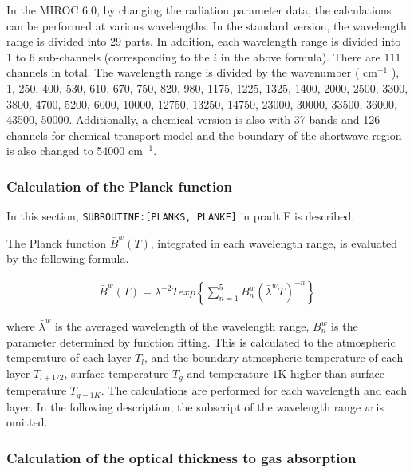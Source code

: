 In the MIROC 6.0, by changing the radiation parameter data, the
calculations can be performed at various wavelengths. In the standard
version, the wavelength range is divided into 29 parts. In addition,
each wavelength range is divided into 1 to 6 sub-channels (corresponding
to the \(i\) in the above formula). There are 111 channels in total. The
wavelength range is divided by the wavenumber ( \(\mathrm{cm}^{-1}\) ),
1, 250, 400, 530, 610, 670, 750, 820, 980, 1175, 1225, 1325, 1400, 2000,
2500, 3300, 3800, 4700, 5200, 6000, 10000, 12750, 13250, 14750, 23000,
30000, 33500, 36000, 43500, 50000. Additionally, a chemical version is
also with 37 bands and 126 channels for chemical transport model and the
boundary of the shortwave region is also changed to 54000
\(\mathrm{cm}^{-1}\).

\hypertarget{calculation-of-the-planck-function}{%
\subsubsection{Calculation of the Planck
function}\label{calculation-of-the-planck-function}}

In this section, \texttt{SUBROUTINE:{[}PLANKS,\ PLANKF{]}} in pradt.F is
described.

The Planck function \(\bar{B}^{w}(T)\), integrated in each wavelength
range, is evaluated by the following formula.

\begin{eqnarray}
\bar{B}^{w}(T)=\lambda^{-2}{Texp}\left\{\sum_{n=1}^{5} B_{n}^{w}\left(\bar{\lambda}^{w} T\right)^{-n}\right\}
\end{eqnarray}

where \(\bar{\lambda}^{w}\) is the averaged wavelength of the wavelength
range, \(B_{n}^{w}\) is the parameter determined by function fitting.
This is calculated to the atmospheric temperature of each layer \(T_l\),
and the boundary atmospheric temperature of each layer \(T_{l+1/2}\),
surface temperature \(T_g\) and temperature \(1\mathrm{K}\) higher than
surface temperature \(T_{g+1K}\). The calculations are performed for
each wavelength and each layer. In the following description, the
subscript of the wavelength range \(w\) is omitted.

\hypertarget{calculation-of-the-optical-thickness-to-gas-absorption}{%
\subsubsection{Calculation of the optical thickness to gas
absorption}\label{calculation-of-the-optical-thickness-to-gas-absorption}}

